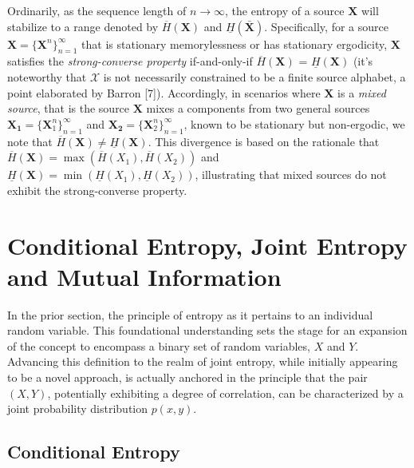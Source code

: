 \documentclass[journal,12pt,onecolumn,draftclsnofoot,]{IEEEtran}
\begin{document}
	
	Ordinarily, as the sequence length of \(n \rightarrow \infty\), the entropy of a source \(\mathbf{X}\) will stabilize to a range denoted by \(\overline{H}( \mathbf{X} )\) and \(\underline{H}(\bar{\mathbf{X}})\). Specifically, for a source \(\mathbf{X} = \{\mathbf{X}^n\}_{n=1}^\infty\) that is stationary memorylessness or has stationary ergodicity, \(\mathbf{X}\) satisfies the \emph{strong-converse property} if-and-only-if  \(\overline{H}({\mathbf{X}})\) = \(\underline{H}(\mathbf{X})\) (it's noteworthy that \(\mathcal{X}\) is not necessarily constrained to be a finite source alphabet, a point elaborated by Barron [7]). Accordingly, in scenarios where \(\mathbf{X}\) is a \emph{mixed source}, that is the source \(\mathbf{X}\) mixes a components from two general sources \(\mathbf{X_1} = \{\mathbf{X}_1^n\}_{n=1}^\infty\) and \(\mathbf{X_2} = \{\mathbf{X}_2^n\}_{n=1}^\infty\),  known to be stationary but non-ergodic,  we note that \(\overline{H}({\mathbf{X}}) \neq \underline{H}(\mathbf{X})\). This divergence is based on the rationale that  \( \overline{H} (\mathbf{X}) = \max ( \overline{H}(X_1), \overline{H}(X_2)) \) and  \( \underline{H} (\mathbf{X}) = \min ( \underline{H}(X_1), \underline{H}(X_2)) \), illustrating that mixed sources do not exhibit the strong-converse property.
		
	
	
	\section{Conditional Entropy, Joint Entropy and Mutual Information}
	In the prior section,  the principle of entropy as it pertains to an individual random variable. This foundational understanding sets the stage for an expansion of the concept to encompass a binary set of random variables, \(X\) and \(Y\). Advancing this definition to the realm of joint entropy, while initially appearing to be a novel approach, is actually anchored in the principle that the pair \((X, Y)\), potentially exhibiting a degree of correlation, can be characterized by a joint probability distribution  \(p(x, y)\).

	\subsection{Conditional Entropy}
	
\end{document}
